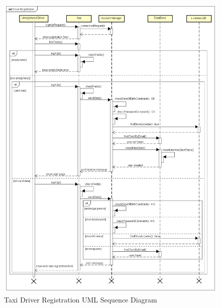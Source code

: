 \documentclass[a4paper]{article}
\begin{document}
\begin{figure}[H]
\includegraphics[width=\sequenceWidth]{Sequence-DriverRegistration}
\centering
\caption{Taxi Driver Registration UML Sequence Diagram}
\label{fig:sequencedriverregistration}
\end{figure}
\end{document}
